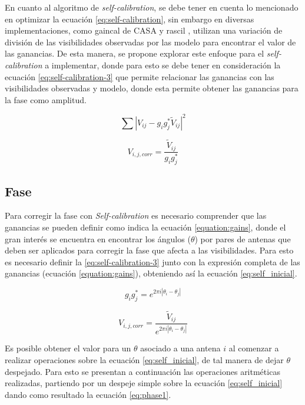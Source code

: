 En cuanto al algoritmo de \textit{self-calibration}, se debe tener en cuenta lo mencionado en optimizar la ecuación \ref{eq:self-calibration}, sin embargo en diversas implementaciones, como gaincal de CASA \citep{gaincal_task} y rascil \citep{rascil}, utilizan una variación de división de las visibilidades observadas por las modelo para encontrar el valor de las ganancias. De esta manera, se propone explorar este enfoque para el \textit{self-calibration} a implementar, donde para esto se debe tener en consideración la ecuación \ref{eq:self-calibration-3} que permite relacionar las ganancias con las visibilidades observadas y modelo, donde esta permite obtener las ganancias para la fase como amplitud.

\begin{equation}
        \sum |V_{ij} - g_{i}g_{j}^{*}\tilde{V}_{ij}|^2
        \label{eq:self-calibration}
\end{equation}

\begin{equation}
    V_{i,j,corr} = \frac{\tilde{V}_{ij}}{g_{i}g_{j}^{*}}
    \label{eq:self-calibration-3}
\end{equation}

\subsection{Fase}

Para corregir la fase con \textit{Self-calibration} es necesario comprender que las ganancias se pueden definir como indica la ecuación \ref{equation:gains}, donde el gran interés se encuentra en encontrar los ángulos ($\theta$) por pares de antenas que deben ser aplicados para corregir la fase que afecta a las visibilidades. Para esto es necesario definir la \ref{eq:self-calibration-3} junto con la expresión completa de las ganancias (ecuación \ref{equation:gains}), obteniendo así la ecuación \ref{eq:self_inicial}. 

\begin{equation}
    g_{i}g_{j}^{*} = e^{2\pi i|\theta_{i} - \theta_{j}|}
    \label{equation:gains}
\end{equation}

\begin{equation}
    V_{i,j,corr} = \frac{\tilde{V}_{ij}}{e^{2\pi i|\theta_{i} - \theta_{j}|}}
    \label{eq:self_inicial}
\end{equation}

Es posible obtener el valor para un $\theta$ asociado a una antena $i$ al comenzar a realizar operaciones sobre la ecuación \ref{eq:self_inicial}, de tal manera de dejar $\theta$ despejado. Para esto se presentan a continuación las operaciones aritméticas realizadas, partiendo por un despeje simple sobre la ecuación \ref{eq:self_inicial} dando como resultado la ecuación \ref{eq:phase1}. 

